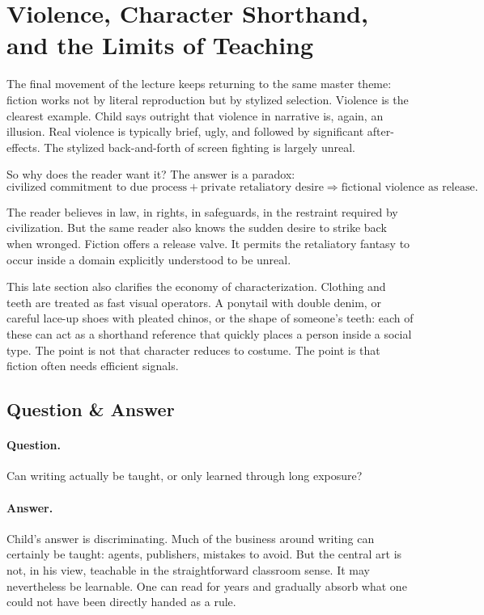 \section{Violence, Character Shorthand, and the Limits of Teaching}

The final movement of the lecture keeps returning to the same master theme: fiction works not by literal reproduction but by stylized selection. Violence is the clearest example. Child says outright that violence in narrative is, again, an illusion. Real violence is typically brief, ugly, and followed by significant after-effects. The stylized back-and-forth of screen fighting is largely unreal.

So why does the reader want it? The answer is a paradox:
\begin{equation}
\text{civilized commitment to due process} + \text{private retaliatory desire}
\Longrightarrow
\text{fictional violence as release}.
\end{equation}

The reader believes in law, in rights, in safeguards, in the restraint required by civilization. But the same reader also knows the sudden desire to strike back when wronged. Fiction offers a release valve. It permits the retaliatory fantasy to occur inside a domain explicitly understood to be unreal.

This late section also clarifies the economy of characterization. Clothing and teeth are treated as fast visual operators. A ponytail with double denim, or careful lace-up shoes with pleated chinos, or the shape of someone's teeth: each of these can act as a shorthand reference that quickly places a person inside a social type. The point is not that character reduces to costume. The point is that fiction often needs efficient signals.

\subsection{Question \& Answer}

\paragraph{Question.} Can writing actually be taught, or only learned through long exposure?

\paragraph{Answer.} Child's answer is discriminating. Much of the business around writing can certainly be taught: agents, publishers, mistakes to avoid. But the central art is not, in his view, teachable in the straightforward classroom sense. It may nevertheless be learnable. One can read for years and gradually absorb what one could not have been directly handed as a rule.

